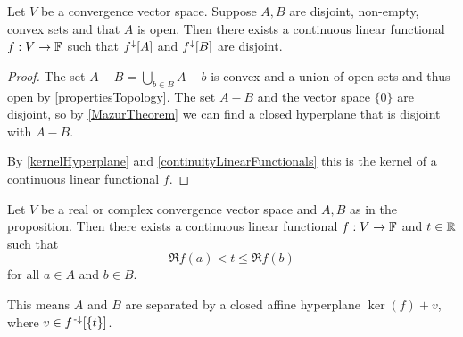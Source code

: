 \begin{theorem} \label{HahnBanachSeparation}
Let $V$ be a convergence vector space. Suppose $A,B$ are disjoint, non-empty, convex sets and that $A$ is open. Then there exists a continuous linear functional $f:V\to \mathbb{F}$ such that $f^\downarrow[A]$ and $f^\downarrow[B]$ are disjoint.
\end{theorem}
\begin{proof}
The set $A-B = \bigcup_{b\in B}A-b$ is convex and a union of open sets and thus open by \ref{propertiesTopology}.
The set $A-B$ and the vector space $\{0\}$ are disjoint, so by \ref{MazurTheorem} we can find a closed hyperplane that is disjoint with $A-B$.

By \ref{kernelHyperplane} and \ref{continuityLinearFunctionals} this is the kernel of a continuous linear functional $f$.
\end{proof}
\begin{corollary}
Let $V$ be a real or complex convergence vector space and $A,B$ as in the proposition. Then there exists a continuous linear functional $f:V\to \mathbb{F}$ and $t\in \mathbb{R}$ such that
\[ \Re f(a) < t \leq \Re f(b) \]
for all $a\in A$ and $b\in B$.
\end{corollary}
This means $A$ and $B$ are separated by a closed affine hyperplane $\ker(f)+v$, where $v \in f^{\text{\hspace{0.15em}-}\downarrow}[\{t\}]$.

